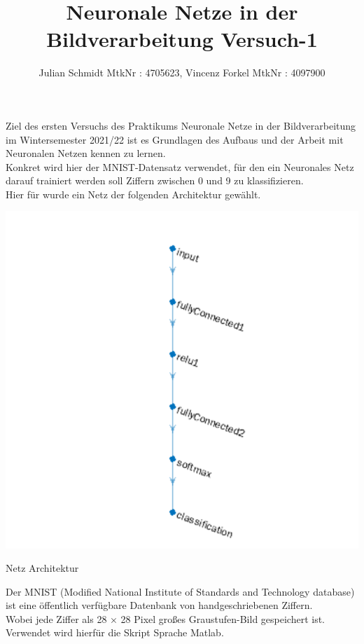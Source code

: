\documentclass[8pt,a4paper]{article}
\title{Neuronale Netze in der Bildverarbeitung Versuch-1}
\author{Julian Schmidt MtkNr : 4705623, Vincenz Forkel MtkNr : 4097900}
\begin{document}
\maketitle
\newpage
Ziel des ersten Versuchs des Praktikums Neuronale Netze in der Bildverarbeitung im Wintersemester 2021/22 ist es Grundlagen des Aufbaus und der Arbeit mit Neuronalen Netzen kennen zu lernen.\\
Konkret wird hier der MNIST-Datensatz verwendet, für den ein Neuronales Netz darauf trainiert werden soll Ziffern zwischen 0 und 9 zu klassifizieren.\\
Hier für wurde ein Netz der folgenden Architektur gewählt.\\

\begin{center}
    

    \includegraphics[scale = 0.4]{model.png}
    \caption{Netz Architektur}
\end{center}


Der MNIST (Modified National Institute of Standards and Technology database) ist eine öffentlich verfügbare Datenbank von handgeschriebenen Ziffern.\\
Wobei jede Ziffer als 28 × 28 Pixel großes Graustufen-Bild gespeichert ist.\\

Verwendet wird hierfür die Skript Sprache Matlab.\\
\end{document}
